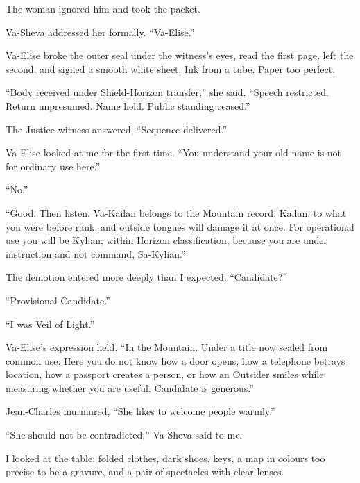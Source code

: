 The woman ignored him and took the packet.\par

Va-Sheva addressed her formally. ``Va-Elise.''\par

Va-Elise broke the outer seal under the witness's eyes, read the first page, left the second, and signed a smooth white sheet. Ink from a tube. Paper too perfect.\par

``Body received under Shield-Horizon transfer,'' she said. ``Speech restricted. Return unpresumed. Name held. Public standing ceased.''\par

The Justice witness answered, ``Sequence delivered.''\par

Va-Elise looked at me for the first time. ``You understand your old name is not for ordinary use here.''\par

``No.''\par

``Good. Then listen. Va-Kailan belongs to the Mountain record; Kailan, to what you were before rank, and outside tongues will damage it at once. For operational use you will be Kylian; within Horizon classification, because you are under instruction and not command, Sa-Kylian.''\par

The demotion entered more deeply than I expected. ``Candidate?''\par

``Provisional Candidate.''\par

``I was Veil of Light.''\par

Va-Elise's expression held. ``In the Mountain. Under a title now sealed from common use. Here you do not know how a door opens, how a telephone betrays location, how a passport creates a person, or how an Outsider smiles while measuring whether you are useful. Candidate is generous.''\par

Jean-Charles murmured, ``She likes to welcome people warmly.''\par

``She should not be contradicted,'' Va-Sheva said to me.\par

I looked at the table: folded clothes, dark shoes, keys, a map in colours too precise to be a gravure, and a pair of spectacles with clear lenses.\par

